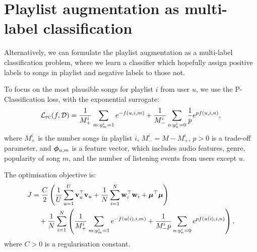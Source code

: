 \section{Playlist augmentation as multi-label classification}

Alternatively, we can formulate the playlist augmentation as a multi-label classification problem,
where we learn a classifier which hopefully assign positive labels to songs in playlist and negative labels to those not.

To focus on the most plausible songs for playlist $i$ from user $u$,
we use the P-Classification loss, with the exponential surrogate:
\begin{equation*}
\begin{aligned}
\mathcal{L}_\textsc{pc}(f, \mathcal{D}) 
&= \frac{1}{M_+^i} \sum_{m: y_m^i = 1} e^{-f(u, i, m)} + \frac{1}{M_-^i} \sum_{n: y_n^i = 0} \frac{1}{p} e^{p f(u, i, n)}, \\
\end{aligned}
\end{equation*}
where $M_+^i$ is the number songs in playlist $i$,
$M_-^i = M - M_+^i$,
$p > 0$ is a trade-off parameter,
and $\bm{\phi}_{u,m}$ is a feature vector,
which includes audio features, genre, popularity of song $m$,
and the number of listening events from users except $u$.

The optimisation objective is:
\begin{equation*}
\begin{aligned}
J &= \frac{C}{2} \left( \frac{1}{U} \sum_{u=1}^U \mathbf{v}_u^\top \mathbf{v}_u 
     + \frac{1}{N} \sum_{i=1}^N \mathbf{w}_i^\top \mathbf{w}_i + \bm{\mu}^\top \bm{\mu} \right) \\
& \hspace{1em}
     + \frac{1}{N} \sum_{i=1}^N \left( \frac{1}{M_+^i} \sum_{m: y_m^i = 1} e^{-f(u(i), i,m)} 
     + \frac{1}{M_-^i p} \sum_{n: y_n^i = 0} e^{p f(u(i), i,n)} \right),
\end{aligned}
\end{equation*}
where $C > 0$ is a regularisation constant.

